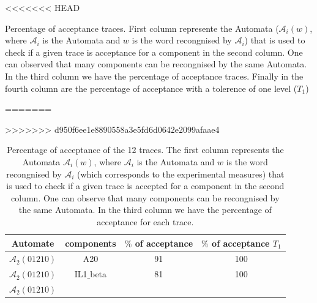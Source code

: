 \begin{table}[!t]
\renewcommand{\arraystretch}{1.3}
<<<<<<< HEAD
\caption{Percentage of acceptance traces. First column represente the Automata ($\mathcal{A}_{i}(w)$, where $\mathcal{A}_{i}$ is the Automata and $w$ is the word recongnised by $\mathcal{A}_{i}$) 
that is used to check if a given trace is acceptance for a component in the second 
column. One can observed that many components can be recongnised by the same Automata. In the third column we have the percentage of acceptance traces. Finally in the fourth column
are the percentage of acceptance with a tolerence of one level ($T_{1}$)}
=======
\caption{Percentage of acceptance of the 12 traces. The first column represents the Automata $\mathcal{A}_{i}(w)$, where $\mathcal{A}_{i}$ is the Automata and $w$ is the word recongnised by $\mathcal{A}_{i}$ 
(which corresponds to the experimental measures) that is used to check if a given trace is accepted for a component in the second 
column. One can observe that many components can be recongnised by the same Automata. 
In the third column we have the percentage of acceptance for each trace.}
>>>>>>> d950f6ee1e8890558a3e5fd6d0642e2099afaae4
\label{traceAnalysis}
\centering
\begin{tabular}{|c|c||c|c|}
\hline

\textbf{Automate}

&

\textbf{components}

&

\textbf{$\%$ of acceptance}

&

\textbf{$\%$ of acceptance $T_{1}$}
\\ \hline

$\mathcal{A}_{2}(01210)$

&

A20

&

91

&

100
\\ \hline

$\mathcal{A}_{2}(01210)$

&

IL1$\_$beta

&

81

&

100
\\ \hline

$\mathcal{A}_{2}(01210)$


\end{tabular}
\end{table}
